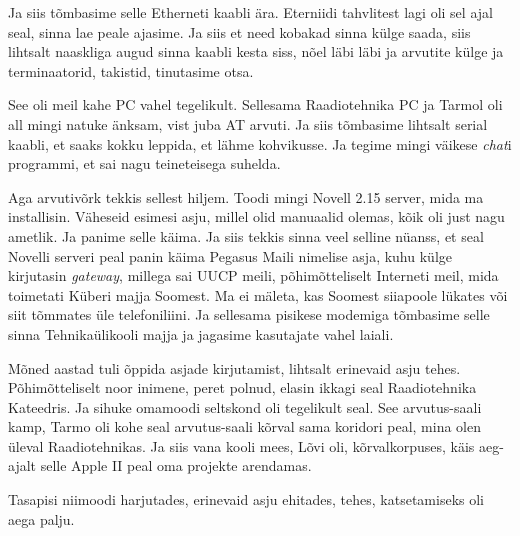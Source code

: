 Ja siis tõmbasime selle Etherneti kaabli ära. Eterniidi tahvlitest lagi oli sel ajal seal, sinna lae peale ajasime. Ja siis et need  kobakad sinna külge saada, siis lihtsalt naaskliga augud sinna kaabli  kesta siss, nõel läbi läbi ja arvutite külge ja terminaatorid, takistid, tinutasime otsa. 


See oli meil kahe PC vahel tegelikult. Sellesama Raadiotehnika PC ja Tarmol oli all mingi natuke änksam, vist juba AT arvuti. Ja siis tõmbasime lihtsalt serial kaabli, et saaks kokku leppida, et lähme kohvikusse. Ja tegime mingi väikese \emph{chat}i programmi, et sai nagu teineteisega suhelda. 

Aga arvutivõrk tekkis sellest hiljem. Toodi mingi Novell 2.15 server, mida ma installisin. Väheseid esimesi asju, millel olid manuaalid olemas, kõik oli just nagu ametlik. Ja panime selle käima. Ja siis tekkis sinna veel selline nüanss, et seal Novelli serveri peal panin käima Pegasus Maili nimelise asja, kuhu külge kirjutasin \emph{gateway}, millega sai UUCP meili, põhimõtteliselt Interneti meil, mida toimetati Küberi majja Soomest. Ma ei mäleta, kas Soomest siiapoole lükates või siit tõmmates üle telefoniliini. Ja sellesama pisikese modemiga tõmbasime selle sinna Tehnikaülikooli majja ja jagasime kasutajate vahel laiali.


Mõned aastad tuli õppida asjade kirjutamist, lihtsalt erinevaid asju tehes. Põhimõtteliselt noor inimene, peret polnud, elasin ikkagi seal Raadiotehnika Kateedris. Ja sihuke omamoodi seltskond oli tegelikult seal. See arvutus-saali kamp, Tarmo oli kohe seal arvutus-saali kõrval sama koridori peal, mina olen üleval Raadiotehnikas. Ja siis vana kooli mees, Lõvi oli, kõrvalkorpuses, käis aeg-ajalt selle Apple II peal oma  projekte arendamas.

Tasapisi niimoodi harjutades, erinevaid asju ehitades, tehes,  katsetamiseks oli aega palju.


